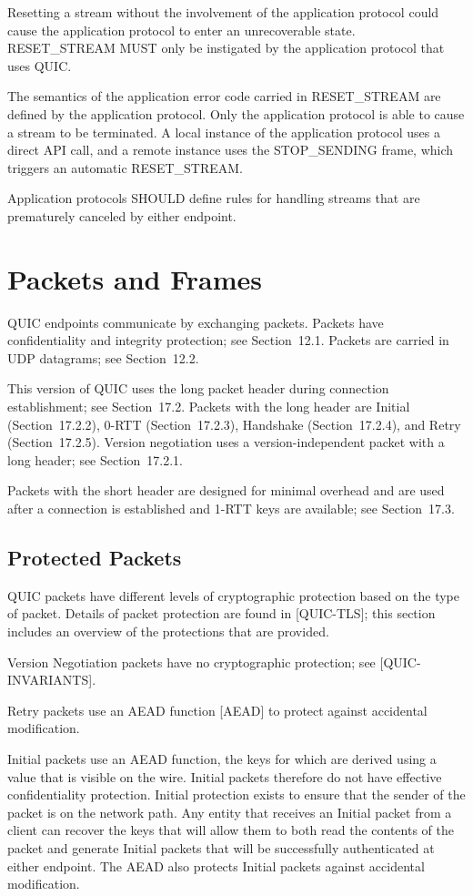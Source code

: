 \documentclass{article}
\begin{document}
Resetting a stream without the involvement of the application protocol could cause the application protocol to enter an unrecoverable state.  RESET\_STREAM MUST only be instigated by the application protocol that uses QUIC.

The semantics of the application error code carried in RESET\_STREAM are defined by the application protocol.  Only the application protocol is able to cause a stream to be terminated.  A local instance of the application protocol uses a direct API call, and a remote instance uses the STOP\_SENDING frame, which triggers an automatic RESET\_STREAM.

Application protocols SHOULD define rules for handling streams that are prematurely canceled by either endpoint.

\section{Packets and Frames}

QUIC endpoints communicate by exchanging packets.  Packets have confidentiality and integrity protection; see Section~12.1.  Packets are carried in UDP datagrams; see Section~12.2.

This version of QUIC uses the long packet header during connection establishment; see Section~17.2.  Packets with the long header are Initial (Section~17.2.2), 0-RTT (Section~17.2.3), Handshake (Section~17.2.4), and Retry (Section~17.2.5).  Version negotiation uses a version-independent packet with a long header; see Section~17.2.1.

Packets with the short header are designed for minimal overhead and are used after a connection is established and 1-RTT keys are available; see Section~17.3.

\subsection{Protected Packets}

QUIC packets have different levels of cryptographic protection based on the type of packet.  Details of packet protection are found in [QUIC-TLS]; this section includes an overview of the protections that are provided.

Version Negotiation packets have no cryptographic protection; see [QUIC-INVARIANTS].

Retry packets use an AEAD function [AEAD] to protect against accidental modification.

Initial packets use an AEAD function, the keys for which are derived using a value that is visible on the wire.  Initial packets therefore do not have effective confidentiality protection.  Initial protection exists to ensure that the sender of the packet is on the network path.  Any entity that receives an Initial packet from a client can recover the keys that will allow them to both read the contents of the packet and generate Initial packets that will be successfully authenticated at either endpoint.  The AEAD also protects Initial packets against accidental modification.
\end{document}
